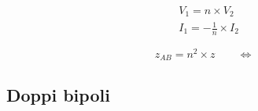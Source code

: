 \documentclass[10pt]{article}
\begin{document}
        \begin{minipage}[t]{.1\textwidth}
            \vspace{-\baselineskip}

            

        \end{minipage}
        \hfill
        \begin{minipage}[t]{.1\textwidth}
            \vspace{-\baselineskip}
            \vspace{.4cm}

            \begin{align*}
                &V_1 = n \times V_2\\
                &I_1 = -\frac{1}{n} \times I_2
            \end{align*}

        \end{minipage}
        \hfill
        \begin{minipage}[t]{.1\textwidth}
            \vspace{-\baselineskip}

            

        \end{minipage}
        \hfill
        \begin{minipage}[t]{.1\textwidth}
            \vspace{.3cm}

            \[
                z_{AB} = n^2 \times z \qquad \iff
            \]

        \end{minipage}
        \hfill
        \begin{minipage}[t]{.1\textwidth}
            \vspace{-\baselineskip}
            \vspace{.7cm}

            

        \end{minipage}

    \vspace{-1.5\baselineskip}
    \subsection*{Doppi bipoli}
\end{document}
